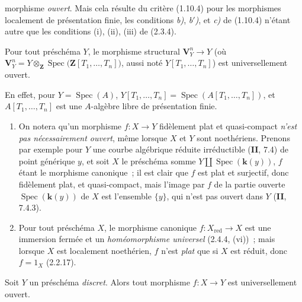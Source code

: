 morphisme \emph{ouvert}. Mais cela résulte du critère (1.10.4) pour les morphismes
localement de présentation finie, les conditions \emph{b)}, \emph{b$'$)}, et
\emph{c)} de (1.10.4) n'étant autre que les conditions (i), (ii), (iii) de
(2.3.4).

\begin{corollary}[2.4.7]
\label{IV.2.4.7-fr}
Pour tout préschéma $Y$, le morphisme structural $\mathbf V_Y^n\to Y$ \textup{(où}
$\mathbf V_Y^n
=Y\otimes_{\mathbf Z}\operatorname{Spec}
  \bigl(\mathbf Z[T_1,\ldots,T_n]\bigr)$,
\textup{aussi noté $Y[T_1,\ldots,T_n]$)} est universellement ouvert.
\end{corollary}

En effet, pour $Y=\operatorname{Spec}(A)$,
$Y[T_1,\ldots,T_n]=\operatorname{Spec}(A[T_1,\ldots,T_n])$, et
$A[T_1,\ldots,T_n]$ est une $A$-algèbre libre de présentation finie.

\begin{remarks}[2.4.8]
\label{IV.2.4.8-fr}
\begin{enumerate}
\item[(i)] On notera qu'un morphisme $f:X\to Y$ fidèlement plat et
quasi-compact \emph{n'est pas nécessairement ouvert}, même lorsque $X$ et $Y$
sont noethériens. Prenons par exemple pour $Y$ une courbe algébrique réduite
irréductible (\textbf{II}, 7.4) de point générique $y$, et soit $X$ le préschéma somme
$Y\amalg\operatorname{Spec}(\boldsymbol{k}(y))$, $f$ étant le morphisme canonique~; il est
clair que $f$ est plat et surjectif, donc fidèlement plat, et quasi-compact,
mais l'image par $f$ de la partie ouverte $\operatorname{Spec}(\boldsymbol{k}(y))$ de $X$
est l'ensemble $\{y\}$, qui n'est pas ouvert dans $Y$ (\textbf{II}, 7.4.3).
\item[(ii)] Pour tout préschéma $X$, le morphisme canonique
$f:X_{\mathrm{red}}\to X$ est une immersion fermée et un
\emph{homéomorphisme universel} (2.4.4, (vi))~; mais lorsque $X$ est
localement noethérien, $f$ n'est \emph{plat} que si $X$ est réduit, donc
$f=1_X$ (2.2.17).
\end{enumerate}
\end{remarks}

\begin{proposition}[2.4.9]
\label{IV.2.4.9-fr}
Soit $Y$ un préschéma \emph{discret}. Alors tout morphisme $f:X\to Y$ est
universellement ouvert.
\end{proposition}

